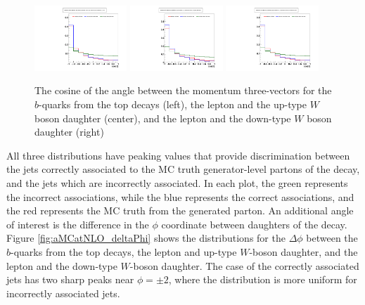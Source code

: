\begin{figure}[hbtp] 
  {\centering
    \includegraphics[width=0.31\textwidth]{Figures/Analysis_Improvement_Diagrams/tt012jets__h_genParticle_ttbarZMFrame_topsRest_cos3dPolarAngle_lepB_hadB__vs__h_recoJets_correctAssoc_ttbarZMFrame_topsRest_cos3dPolarAngle_lepB_hadB__vs__h_recoJets_wrongAssoc_ttbarZMFrame_topsRest_cos3dPolarAngle_lepB_hadB__unitNorm.pdf}
    \includegraphics[width=0.31\textwidth]{Figures/Analysis_Improvement_Diagrams/tt012jets__h_genParticle_ttbarZMFrame_topsRest_cos3dPolarAngle_lep_hadWupQ__vs__h_recoJets_correctAssoc_ttbarZMFrame_topsRest_cos3dPolarAngle_lep_hadWupQ__vs__h_recoJets_wrongAssoc_ttbarZMFrame_topsRest_cos3dPolarAngle_lep_hadWupQ__unitNorm.pdf}
    \includegraphics[width=0.31\textwidth]{Figures/Analysis_Improvement_Diagrams/tt012jets__h_genParticle_ttbarZMFrame_topsRest_cos3dPolarAngle_lepB_hadB__vs__h_recoJets_correctAssoc_ttbarZMFrame_topsRest_cos3dPolarAngle_lepB_hadB__vs__h_recoJets_wrongAssoc_ttbarZMFrame_topsRest_cos3dPolarAngle_lepB_hadB__unitNorm.pdf}
    \caption{The cosine of the angle between the momentum
      three-vectors for the $b$-quarks from the top decays (left), the
    lepton and the up-type $W$ boson daughter (center), and the lepton
  and the down-type $W$ boson daughter (right)}
    \label{fig:aMCatNLO_cos3dPolar}}
\end{figure}

\noindent All three distributions have peaking values that provide
discrimination between the jets correctly associated to the MC truth
generator-level partons of the \ttbar decay, and the jets which are
incorrectly associated.  In each plot, the green represents the
incorrect associations, while the blue represents the correct
associations, and the red represents the MC truth from the generated
parton.  An additional angle of interest is the difference in the
$\phi$ coordinate between daughters of the \ttbar decay.  Figure
\ref{fig:aMCatNLO_deltaPhi} shows the distributions for the
$\Delta\phi$ between the $b$-quarks from the top decays, the lepton
and up-type $W$-boson daughter, and the lepton and the down-type
$W$-boson daughter.  The case of the correctly associated jets has two
sharp peaks near $\phi = \pm 2$, where the distribution is more
uniform for incorrectly associated jets.  

